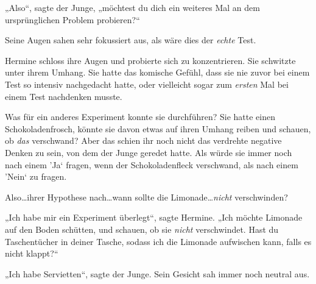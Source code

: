„Also“, sagte der Junge, „möchtest du dich ein weiteres Mal an dem ursprünglichen Problem probieren?“

Seine Augen sahen sehr fokussiert aus, als wäre dies der \emph{echte} Test.

Hermine schloss ihre Augen und probierte sich zu konzentrieren. Sie schwitzte unter ihrem Umhang. Sie hatte das komische Gefühl, dass sie nie zuvor bei einem Test so intensiv nachgedacht hatte, oder vielleicht sogar zum \emph{ersten} Mal bei einem Test nachdenken musste.

Was für ein anderes Experiment konnte sie durchführen? Sie hatte einen Schokoladenfrosch, könnte sie davon etwas auf ihren Umhang reiben und schauen, ob \emph{das} verschwand? Aber das schien ihr noch nicht das verdrehte negative Denken zu sein, von dem der Junge geredet hatte. Als würde sie immer noch nach einem ’Ja‘ fragen, wenn der Schokoladenfleck verschwand, als nach einem ’Nein‘ zu fragen.

Also…ihrer Hypothese nach…wann sollte die Limonade…\emph{nicht} verschwinden?

„Ich habe mir ein Experiment überlegt“, sagte Hermine. „Ich möchte Limonade auf den Boden schütten, und schauen, ob sie \emph{nicht} verschwindet. Hast du Taschentücher in deiner Tasche, sodass ich die Limonade aufwischen kann, falls es nicht klappt?“

„Ich habe Servietten“, sagte der Junge. Sein Gesicht sah immer noch neutral aus.

